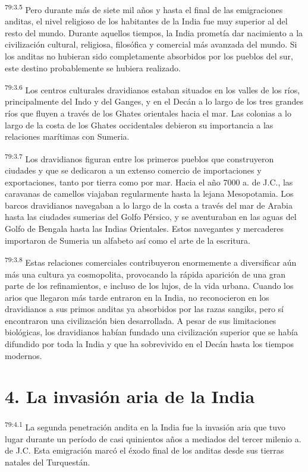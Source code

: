 \par
\textsuperscript{79:3.5} Pero durante más de siete mil años y hasta el final de las emigraciones anditas, el nivel religioso de los habitantes de la India fue muy superior al del resto del mundo. Durante aquellos tiempos, la India prometía dar nacimiento a la civilización cultural, religiosa, filosófica y comercial más avanzada del mundo. Si los anditas no hubieran sido completamente absorbidos por los pueblos del sur, este destino probablemente se hubiera realizado.

\par
\textsuperscript{79:3.6} Los centros culturales dravidianos estaban situados en los valles de los ríos, principalmente del Indo y del Ganges, y en el Decán a lo largo de los tres grandes ríos que fluyen a través de los Ghates orientales hacia el mar. Las colonias a lo largo de la costa de los Ghates occidentales debieron su importancia a las relaciones marítimas con Sumeria.

\par
\textsuperscript{79:3.7} Los dravidianos figuran entre los primeros pueblos que construyeron ciudades y que se dedicaron a un extenso comercio de importaciones y exportaciones, tanto por tierra como por mar. Hacia el año 7000 a. de J.C., las caravanas de camellos viajaban regularmente hasta la lejana Mesopotamia. Los barcos dravidianos navegaban a lo largo de la costa a través del mar de Arabia hasta las ciudades sumerias del Golfo Pérsico, y se aventuraban en las aguas del Golfo de Bengala hasta las Indias Orientales. Estos navegantes y mercaderes importaron de Sumeria un alfabeto así como el arte de la escritura.

\par
\textsuperscript{79:3.8} Estas relaciones comerciales contribuyeron enormemente a diversificar aún más una cultura ya cosmopolita, provocando la rápida aparición de una gran parte de los refinamientos, e incluso de los lujos, de la vida urbana. Cuando los arios que llegaron más tarde entraron en la India, no reconocieron en los dravidianos a sus primos anditas ya absorbidos por las razas sangiks, pero sí encontraron una civilización bien desarrollada. A pesar de sus limitaciones biológicas, los dravidianos habían fundado una civilización superior que se había difundido por toda la India y que ha sobrevivido en el Decán hasta los tiempos modernos.

\section*{4. La invasión aria de la India}
\par
\textsuperscript{79:4.1} La segunda penetración andita en la India fue la invasión aria que tuvo lugar durante un período de casi quinientos años a mediados del tercer milenio a. de J.C. Esta emigración marcó el éxodo final de los anditas desde sus tierras natales del Turquestán.

